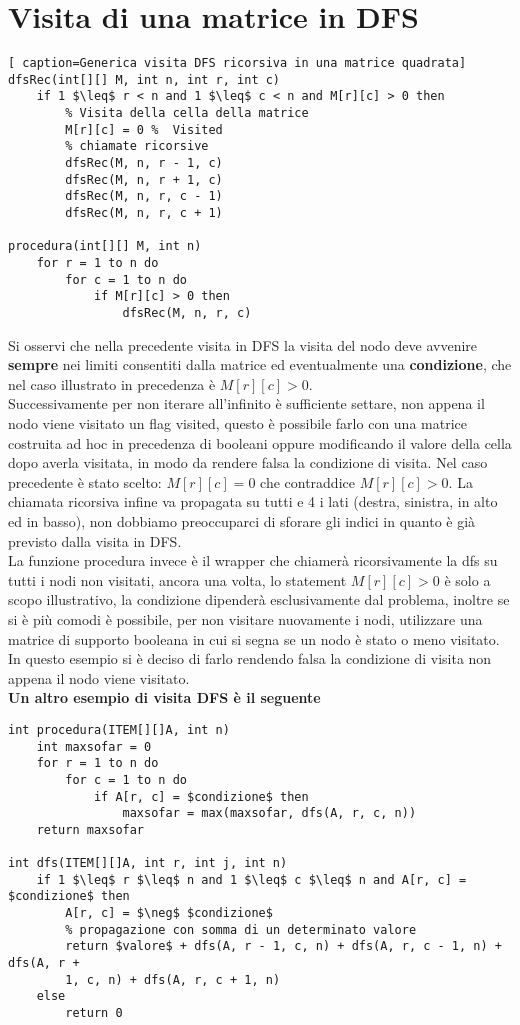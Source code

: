 \documentclass[../cheatSheetAlgoritmi.tex]{subfiles}
\begin{document}
\section{Visita di una matrice in DFS}
\begin{lstlisting}[ caption=Generica visita DFS ricorsiva in una matrice quadrata]
dfsRec(int[][] M, int n, int r, int c)
	if 1 $\leq$ r < n and 1 $\leq$ c < n and M[r][c] > 0 then
    	% Visita della cella della matrice
    	M[r][c] = 0	%  Visited
    	% chiamate ricorsive
    	dfsRec(M, n, r - 1, c)
    	dfsRec(M, n, r + 1, c)
    	dfsRec(M, n, r, c - 1)
    	dfsRec(M, n, r, c + 1)

procedura(int[][] M, int n)
	for r = 1 to n do
    	for c = 1 to n do
      		if M[r][c] > 0 then
        		dfsRec(M, n, r, c)
\end{lstlisting}
Si osservi che nella precedente visita in DFS la visita del nodo deve avvenire \textbf{sempre} nei limiti consentiti dalla matrice ed eventualmente una \textbf{condizione}, che nel caso illustrato in precedenza è $M[r][c] > 0$. \\
Successivamente per non iterare all'infinito è sufficiente settare, non appena il nodo viene visitato un flag visited, questo è possibile farlo con una matrice costruita ad hoc in precedenza di booleani oppure modificando il valore della cella dopo averla visitata, in modo da rendere falsa la condizione di visita. Nel caso precedente è stato scelto: $M[r][c] = 0$ che contraddice $M[r][c] > 0$. La chiamata ricorsiva infine va propagata su tutti e 4 i lati (destra, sinistra, in alto ed in basso), non dobbiamo preoccuparci di sforare gli indici in quanto è già previsto dalla visita in DFS.\\
La funzione procedura invece è il wrapper che chiamerà ricorsivamente la dfs su tutti i nodi non visitati, ancora una volta, lo statement $M[r][c] > 0$ è solo a scopo illustrativo, la condizione dipenderà esclusivamente dal problema, inoltre se si è più comodi è possibile, per non visitare nuovamente i nodi, utilizzare una matrice di supporto booleana in cui si segna se un nodo è stato o meno visitato. In questo esempio si è deciso di farlo rendendo falsa la condizione di visita non appena il nodo viene visitato.\\
\textbf{Un altro esempio di visita DFS è il seguente}
\begin{lstlisting}[caption=DFS generica con return di valore]
% esempio tenere il valore massimo
int procedura(ITEM[][]A, int n)
	int maxsofar = 0
  	for r = 1 to n do
    	for c = 1 to n do
      		if A[r, c] = $condizione$ then
       	 		maxsofar = max(maxsofar, dfs(A, r, c, n))
  	return maxsofar

int dfs(ITEM[][]A, int r, int j, int n)
	if 1 $\leq$ r $\leq$ n and 1 $\leq$ c $\leq$ n and A[r, c] = $condizione$ then
    	A[r, c] = $\neg$ $condizione$
    	% propagazione con somma di un determinato valore
    	return $valore$ + dfs(A, r - 1, c, n) + dfs(A, r, c - 1, n) + dfs(A, r +
  		1, c, n) + dfs(A, r, c + 1, n)
  	else
    	return 0
\end{lstlisting}
\end{document}
